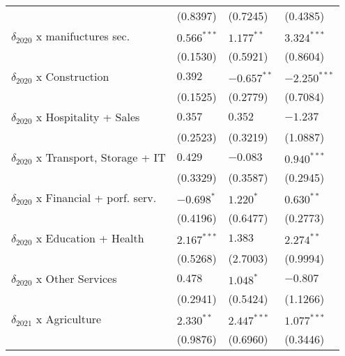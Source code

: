 \begin{tabular}{llll}
                                                   &           (0.8397) &           (0.7245) &           (0.4385) \\
$\delta_{2020}$ x manifuctures sec.                &      $0.566^{***}$ &       $1.177^{**}$ &      $3.324^{***}$ \\
                                                   &           (0.1530) &           (0.5921) &           (0.8604) \\
$\delta_{2020}$ x Construction                     &            $0.392$ &      $-0.657^{**}$ &     $-2.250^{***}$ \\
                                                   &           (0.1525) &           (0.2779) &           (0.7084) \\
$\delta_{2020}$ x Hospitality + Sales              &            $0.357$ &            $0.352$ &           $-1.237$ \\
                                                   &           (0.2523) &           (0.3219) &           (1.0887) \\
$\delta_{2020}$ x Transport, Storage + IT          &            $0.429$ &           $-0.083$ &      $0.940^{***}$ \\
                                                   &           (0.3329) &           (0.3587) &           (0.2945) \\
$\delta_{2020}$ x Financial + porf. serv.          &         $-0.698^*$ &          $1.220^*$ &       $0.630^{**}$ \\
                                                   &           (0.4196) &           (0.6477) &           (0.2773) \\
$\delta_{2020}$ x Education + Health               &      $2.167^{***}$ &            $1.383$ &       $2.274^{**}$ \\
                                                   &           (0.5268) &           (2.7003) &           (0.9994) \\
$\delta_{2020}$ x Other Services                   &            $0.478$ &          $1.048^*$ &           $-0.807$ \\
                                                   &           (0.2941) &           (0.5424) &           (1.1266) \\
$\delta_{2021}$ x Agriculture                      &       $2.330^{**}$ &      $2.447^{***}$ &      $1.077^{***}$ \\
                                                   &           (0.9876) &           (0.6960) &           (0.3446) \\

\end{tabular}
